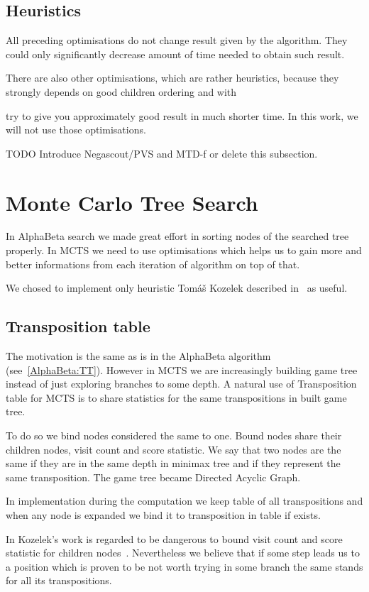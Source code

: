 \subsection{Heuristics}
All preceding optimisations do not change result given by the algorithm. They
could only significantly decrease amount of time needed to obtain such result.

There are also other optimisations, which are rather heuristics, because they strongly depends on good children ordering and with 

try to
give you approximately good result in much shorter time. In this work, we
will not use those optimisations.

TODO Introduce  Negascout/PVS and MTD-f or delete this subsection.


\section{Monte Carlo Tree Search}
In AlphaBeta search we made great effort in sorting nodes of the searched tree
properly. In MCTS we need to use optimisations which helps us to gain more and
better informations from each iteration of algorithm on top of that.

We chosed to implement only heuristic Tomáš Kozelek described in~\cite{KOZELEK}
as useful.

\subsection{Transposition table}
The motivation is the same as is in the AlphaBeta algorithm
(see~\ref{AlphaBeta:TT}). However in MCTS we are increasingly building game
tree instead of just exploring branches to some depth. A natural use of
Transposition table for MCTS is to share statistics for the same transpositions
in built game tree.

To do so we bind nodes considered the same to one. Bound nodes share their
children nodes, visit count and score statistic. We say that two nodes are the
same if they are in the same depth in minimax tree and if they represent the
same transposition. The game tree became Directed Acyclic Graph.

In implementation during the computation we keep table of all transpositions
and when any node is expanded we bind it to transposition in table if exists.

In Kozelek's work is regarded to be dangerous to bound visit count and score
statistic for children nodes~\cite{KOZELEK}. Nevertheless we believe that if
some step leads us to a position which is proven to be not worth trying in some
branch the same stands for all its transpositions.

